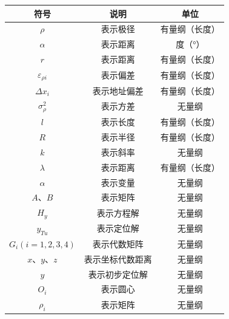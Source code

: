 \begin{table}[ht]
\centering
\begin{tabular}{ccc} 
    \hline
    \Large 符号 & \Large 说明 & \Large 单位 \\
    \hline

    $\rho$ & 表示极径 & 有量纲（长度） \\
    $\alpha$ & 表示距离 & 度（°） \\
    $r$ & 表示距离 & 有量纲（长度） \\
    $\varepsilon_{\rho i}$ & 表示偏差 & 有量纲（长度） \\
    $\Delta x_i$ & 表示地址偏差 & 有量纲（长度） \\
    $\sigma^2_\rho$ & 表示方差 & 无量纲 \\
    $l$ & 表示长度 & 有量纲（长度） \\
    $R$ & 表示半径 & 有量纲（长度） \\
    $k$ & 表示斜率 & 无量纲 \\
    $\lambda$ & 表示距离 & 有量纲（长度） \\
    $\alpha$ & 表示变量 & 无量纲 \\
    $A$、$B$ & 表示矩阵 & 无量纲 \\
    $H_y$ & 表示方程解 & 无量纲 \\
    $y_{Tu}$ & 表示定位解 & 无量纲 \\
    $G_i(i=1,2,3,4)$ & 表示代数矩阵 & 无量纲 \\
    $x$、$y$、$z$ & 表示坐标代数距离 & 无量纲 \\
    $y$ & 表示初步定位解 & 无量纲 \\
    $O_i$ & 表示圆心 & 无量纲 \\
    $\rho_i$ & 表示矩阵 & 无量纲 \\

    \hline 
\end{tabular}
\end{table}